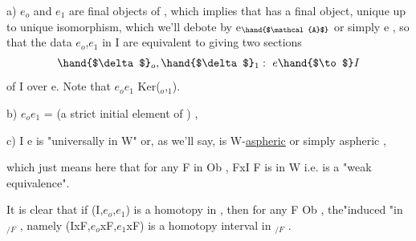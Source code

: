 a)  $e_o$ and $e_1$ are  final objects of  ,
which implies that  has a final object, unique up to unique isomorphism,
which we'll debote by e$_{\hand{$\mathcal{A}$}}$ or simply e , so that the data  $e_o$,$e_1$ in I are
equivalent to giving two sections
\[ \hand{$\delta$}_o , \hand{$\delta$}_1 :\ e \hand{$\to$} I \]
of I over e.  Note that  $e_o$\hand{$\cap$}$e_1$ \hand{$=$} Ker(\hand{$\delta$}$_o$,\hand{$\delta$}$_1$).

b)  $e_o$\hand{$\cap$}$e_1$ =  (a strict initial element of  ) ,

c)  I \hand{$\to$} e is "universally in W" or,  as we'll say, is W-\uline{aspheric} or
simply aspheric ,

which just means here that  for any  F in Ob  ,  FxI \hand{$\to$} F is in W i.e.
is a "weak equivalence".

It is clear that if (I,$e_o$,$e_1$) is a homotopy  in , then
for any F \hand{$\in$} Ob  ,  the"induced "in $_{/F}$ ,  namely (IxF,$e_o$xF,$e_1$xF)
is a homotopy interval in $_{/F}$ .
